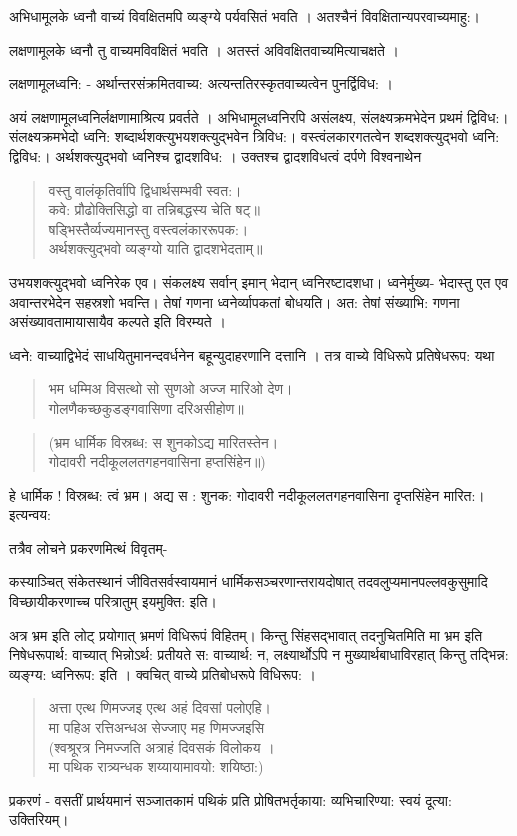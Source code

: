 अभिधामूलके ध्वनौ वाच्यं विवक्षितमपि व्यङ्ग्ये पर्यवसितं भवति । अतश्चैनं विवक्षितान्यपरवाच्यमाहु:।

लक्षणामूलके ध्वनौ तु वाच्यमविवक्षितं भवति । अतस्तं अविवक्षितवाच्यमित्याचक्षते ।

लक्षणामूलध्वनि: - अर्थान्तरसंक्रमितवाच्य: अत्यन्ततिरस्कृतवाच्यत्वेन पुनर्द्विविध: ।

अयं लक्षणामूलध्वनिर्लक्षणामाश्रित्य प्रवर्तते । अभिधामूलध्वनिरपि असंलक्ष्य,  संलक्ष्यक्रमभेदेन प्रथमं द्विविध:।  संलक्ष्यक्रमभेदो ध्वनि: शब्दार्थशक्त्युभयशक्त्युद्भवेन त्रिविध:। वस्त्वंलकारगतत्वेन शब्दशक्त्युद्भवो ध्वनि: द्विविध:। अर्थशक्त्युद्भवो ध्वनिश्च द्वादशविध: । उक्तश्च द्वादशविधत्वं दर्पणे विश्वनाथेन

\begin{verse}
वस्तु वालंकृतिर्वापि द्विधार्थसम्भवी स्वत:।\\
कवे: प्रौढोक्तिसिद्धो वा तन्निबद्धस्य चेति षट्॥\\
षड्भिस्तैर्व्यज्यमानस्तु वस्त्वलंकाररूपक:।\\
अर्थशक्त्युद्भवो व्यङ्ग्यो याति द्वादशभेदताम्॥
\end{verse}
उभयशक्त्युद्भवो ध्वनिरेक एव। संकलक्ष्य सर्वान् इमान् भेदान् ध्वनिरष्टादशधा। ध्वनेर्मुख्य- भेदास्तु एत एव अवान्तरभेदेन सहस्रशो भवन्ति। तेषां गणना ध्वनेर्व्यापकतां बोधयति। अत: तेषां संख्याभि: गणना असंख्यावतामायासायैव कल्पते इति विरम्यते ।

ध्वने: वाच्याद्विभेदं साधयितुमानन्दवर्धनेन बहून्युदाहरणानि दत्तानि । तत्र वाच्ये विधिरूपे प्रतिषेधरूप: यथा 
\begin{verse}
भम धम्मिअ विसत्थो सो सुणओ अज्ज मारिओ देण।\\
गोलणैकच्छकुडङ्गवासिणा दरिअसीहोण॥
\end{verse}
\begin{verse}
(भ्रम धार्मिक विस्रब्ध: स शुनकोऽद्य मारितस्तेन।\\
गोदावरी नदीकूललतगहनवासिना हप्तसिंहेन॥)
\end{verse}
हे धार्मिक !  विस्रब्ध: त्वं भ्रम। अद्य स : शुनक: गोदावरी नदीकूललतगहनवासिना दृप्तसिंहेन मारित:। इत्यन्वय:

तत्रैव लोचने प्रकरणमित्थं विवृतम्-

कस्याञ्चित् संकेतस्थानं जीवितसर्वस्वायमानं धार्मिकसञ्चरणान्तरायदोषात् तदवलुप्यमानपल्लवकुसुमादि विच्छायीकरणाच्च परित्रातुम् इयमुक्ति: इति।

अत्र भ्रम इति लोट् प्रयोगात् भ्रमणं विधिरूपं विहितम्। किन्तु सिंहसद्भावात् तदनुचितमिति मा भ्रम इति निषेधरूपार्थ: वाच्यात् भिन्नोऽर्थ: प्रतीयते स: वाच्यार्थ: न, लक्ष्यार्थोऽपि न मुख्यार्थबाधाविरहात् किन्तु तद्भिन्न: व्यङ्ग्य: ध्वनिरूप: इति । क्वचित् वाच्ये प्रतिबोधरूपे विधिरूप: ।
\begin{verse}
अत्ता एत्थ णिमज्जइ एत्थ अहं दिवसां पलोएहि।\\
मा पहिअ रत्तिअन्धअ सेज्जाए मह णिमज्जइसि\\
(श्वश्रूरत्र निमज्जति अत्राहं दिवसकं विलोकय ।\\
मा पथिक रात्र्यन्धक शय्यायामावयो: शयिष्ठा:)
\end{verse}
प्रकरणं - वसतीं प्रार्थयमानं सञ्जातकामं पथिकं प्रति प्रोषितभर्तृकाया: व्यभिचारिण्या: स्वयं दूत्या: उक्तिरियम्।

